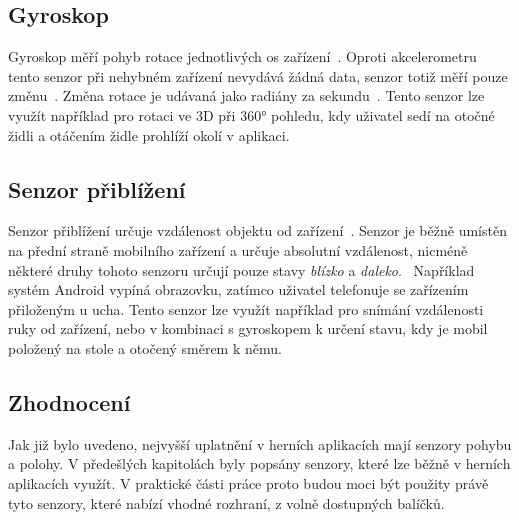 \subsection{Gyroskop}

Gyroskop měří pohyb rotace jednotlivých os zařízení~\cite{sensors_motion}.
Oproti akcelerometru tento senzor při nehybném zařízení
nevydává žádná data,
senzor totiž měří pouze změnu~\cite{sensors_motion}.
Změna rotace je udávaná jako radiány za sekundu~\cite{sensors_motion}.
Tento senzor lze využít například pro rotaci ve 3D při 360° pohledu,
kdy uživatel sedí na otočné židli a otáčením židle prohlíží okolí v aplikaci.

\subsection{Senzor přiblížení}

Senzor přiblížení určuje vzdálenost objektu od zařízení~\cite{sensors_position}.
Senzor je běžně umístěn na přední straně mobilního zařízení
a určuje absolutní vzdálenost,
nicméně některé druhy tohoto senzoru určují pouze
stavy \emph{blízko} a \emph{daleko}.~\cite{sensors_position}
Například systém Android vypíná obrazovku,
zatímco uživatel telefonuje se zařízením přiloženým u ucha.
Tento senzor lze využít například pro snímání vzdálenosti ruky od zařízení,
nebo v kombinaci s gyroskopem k určení stavu,
kdy je mobil položený na stole a otočený směrem k němu.

\subsection{Zhodnocení}

Jak již bylo uvedeno,
nejvyšší uplatnění v herních aplikacích mají senzory pohybu a polohy.
V předešlých kapitolách byly popsány senzory,
které lze běžně v herních aplikacích využít.
V praktické části práce proto budou moci být použity právě tyto senzory,
které nabízí vhodné rozhraní,
z volně dostupných balíčků.
